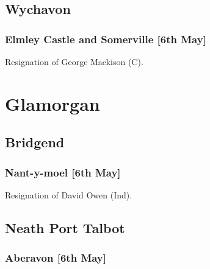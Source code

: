 \documentclass[a4paper,openany]{book}
\begin{document}
\begin{resultsiii}
\subsection*{Wychavon}

\subsubsection*{Elmley Castle and Somerville \hspace*{\fill}\nolinebreak[1]%
	\enspace\hspace*{\fill}
	[6th May]}


Resignation of George Mackison (C).

\section{Glamorgan}

\subsection*{Bridgend}

\subsubsection*{Nant-y-moel \hspace*{\fill}\nolinebreak[1]%
	\enspace\hspace*{\fill}
	[6th May]}


Resignation of David Owen (Ind).

\subsection*{Neath Port Talbot}

\subsubsection*{Aberavon \hspace*{\fill}\nolinebreak[1]%
	\enspace\hspace*{\fill}
	[6th May]}



\end{resultsiii}
\end{document}
